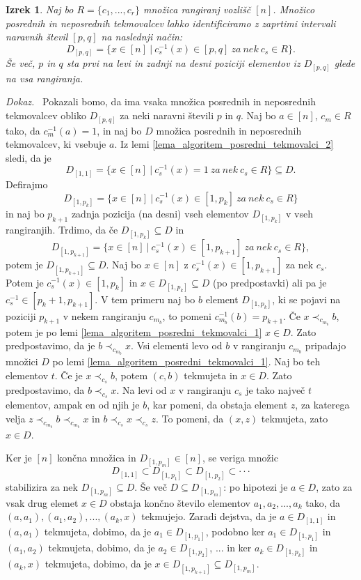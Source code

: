 \documentclass[a4paper, 12pt]{book}
\newtheorem{izrek}{Izrek}[chapter]
\newenvironment{dokaz}{\emph{Dokaz.}\ }{\hspace{\fill}{$\Box$}}
\begin{document}
\begin{izrek}
    Naj bo $R = \{ c_1, ..., c_r \}$ množica rangiranj vozlišč $[n]$. Množico posrednih in neposrednih tekmovalcev lahko identificiramo z zaprtimi intervali naravnih števil $[p, q]$ na naslednji način: 
    \[
        D_{[p, q]} = \{ x \in [n] \ | \ c_s^{-1}(x) \in [p, q] \ za \ nek \ c_s \in R\}.
    \]
    Še več, $p$ in $q$ sta prvi na levi in zadnji na desni poziciji elementov iz $D_{[p, q]}$ glede na vsa rangiranja.
\end{izrek}
\begin{dokaz}
    Pokazali bomo, da ima vsaka množica posrednih in neposrednih tekmovalcev obliko $D_{[p, q]}$ za neki naravni števili $p$ in $q$. Naj bo $a \in [n]$, $c_m \in R$ tako, da $c_m^{-1}(a) = 1$, in naj bo $D$ množica posrednih in neposrednih tekmovalcev, ki vsebuje $a$. Iz lemi \ref{lema_algoritem_posredni_tekmovalci_2} sledi, da je 
    \[ 
        D_{[1,1]} = \{ x \in [n] \ | \ c_s^{-1}(x) = 1 \ za \ nek \ c_s \in R \} \subseteq D.
    \] 
    Defirajmo 
    \[
        D_{[1, p_k]} = \{ x \in [n] \ | \ c_s^{-1}(x) \in [1, p_k] \ za \ nek \ c_s \in R\}
    \] 
    in naj bo $p_{k+1}$ zadnja pozicija (na desni) vseh elementov $D_{[1, p_k]}$ v vseh rangiranjih. Trdimo, da če $D_{[1, p_k]} \subseteq D$ in 
    \[
        D_{[1, p_{k+1}]} = \{ x \in [n] \ | \ c_s^{-1}(x) \in [1, p_{k+1}] \ za \ nek \ c_s \in R\},
    \] 
    potem je $D_{[1, p_{k+1}]} \subseteq D$. Naj bo $x \in [n]$ z $c_s^{-1}(x) \in [1, p_{k+1}]$ za nek $c_s$. Potem je $c_s^{-1}(x) \in [1, p_k]$ in $x \in D_{[1, p_k]} \subseteq D$ (po predpostavki) ali pa je $c_s^{-1} \in [p_k + 1, p_{k+1}]$. V tem primeru naj bo $b$ element $D_{[1,p_k]}$, ki se pojavi na poziciji $p_{k+1}$ v nekem rangiranju $c_{m_b}$, to pomeni $c_{m_b}^{-1}(b) = p_{k+1}$. Če $x \prec_{c_{m_b}} b$, potem je po lemi \ref{lema_algoritem_posredni_tekmovalci_1} $x \in D$. Zato predpostavimo, da je $b \prec_{c_{m_b}} x$. Vsi elementi levo od $b$ v rangiranju $c_{m_b}$ pripadajo množici $D$ po lemi \ref{lema_algoritem_posredni_tekmovalci_1}. Naj bo teh elementov $t$. Če je $x \prec_{c_s} b$, potem $(c, b)$ tekmujeta in $x \in D$. Zato predpostavimo, da $b \prec_{c_s} x$. Na levi od $x$ v rangiranju $c_s$ je tako največ $t$ elementov, ampak en od njih je $b$, kar pomeni, da obstaja element $z$, za katerega velja $z \prec_{c_{m_b}} b \prec_{c_{m_b}} x$ in $b \prec_{c_s} x \prec_{c_s} z$. To pomeni, da $(x, z)$ tekmujeta, zato $x \in D$.

    Ker je $[n]$ končna množica in $D_{[1, p_m]} \in [n]$, se veriga množic 
    \[
        D_{[1, 1]} \subset D_{[1, p_1]} \subset D_{[1, p_2]} \subset \cdot\cdot\cdot    
    \]
    stabilizira za nek $D_{[1, p_m]} \subseteq D$. Še več $D \subseteq D_{[1, p_m]}$: po hipotezi je $a \in D$, zato za vsak drug elemet $x \in D$ obstaja končno število elementov $a_1, a_2, ..., a_k$ tako, da $(a, a_1),(a_1, a_2), ..., (a_k, x)$ tekmujejo. Zaradi dejstva, da je $a \in D_{[1, 1]}$ in $(a, a_1)$ tekmujeta, dobimo, da je $a_1 \in D_{[1, p_1]}$, podobno ker $a_1 \in D_{[1, p_1]}$ in $(a_1, a_2)$ tekmujeta, dobimo, da je $a_2 \in D_{[1, p_2]}$, ... in ker $a_{k} \in D_{[1, p_k]}$ in $(a_k, x)$ tekmujeta, dobimo, da je $x \in D_{[1, p_{k+1}]} \subseteq D_{[1, p_m]}$.


\end{dokaz}
\end{document}
